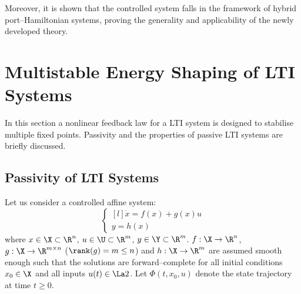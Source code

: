 Moreover, it is shown that the controlled system falls in the framework of hybrid port--Hamiltonian systems, proving the generality and applicability of the newly developed theory.
%

\clearpage

\section{Multistable Energy Shaping of LTI Systems}\label{sec:multistable}
%
In this section a nonlinear feedback law for a LTI system is designed to stabilise multiple fixed points. Passivity and the properties of passive LTI systems are briefly discussed.
\subsection{Passivity of LTI Systems}
%
Let us consider a controlled affine system:
\begin{equation}\label{eq:nlaffine}
    \left\{
    \begin{matrix*}[l]
        \dot{x} = f(x) + g(x)u\\
        y = h(x)
    \end{matrix*}
    \right.
\end{equation}
where $x\in\X\subset\R^n$, $u\in\U\subset\R^m$, $y\in\Y\subset\R^m$. $f:\X\rightarrow\R^n$, $g:\X\rightarrow\R^{m\times n}$ ($\rank(g)= m\leq n$) and $h:\X\rightarrow\R^m$ are assumed smooth enough such that the solutions are forward--complete for all initial conditions $x_0\in\X$ and all inputs $u(t)\in\La2$. Let $\Phi(t,x_0,u)$ denote the state trajectory at time $t\geq0$.

